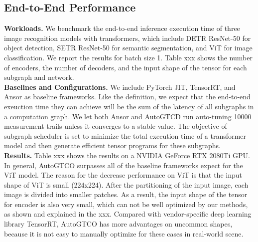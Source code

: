 \subsection{End-to-End Performance}
\textbf{Workloads.} We benchmark the end-to-end inference execution time of three image recognition models with transformers, which include DETR ResNet-50
for object detection, SETR ResNet-50 for semantic segmentation, and ViT for image classification. We report the results for batch size 1. Table xxx shows the number of encoders, the number of decoders, and the input shape of the tensor for each subgraph and network. \\
\textbf{Baselines and Configurations.} We include PyTorch JIT, TensorRT, and Ansor as baseline frameworks. Like the definition, we expect that
the end-to-end exeuction time they can achieve will be the sum of the latency of all subgraphs in a computation graph. We let both Ansor and AutoGTCD run 
auto-tuning 10000 measurement trails unless it converges to a stable value. The objective of subgraph scheduler is set to minimize the total execution time
of a transformer model and then generate efficient tensor programs for these subgraphs.\\
\textbf{Results.} Table xxx shows the results on a NVIDIA GeForce RTX 2080Ti GPU. In general, AutoGTCO surpasses all of the baseline frameworks expect for the ViT model. The reason for the decrease performance on ViT is that the input shape of ViT is small (224x224). After the partitioning of the input
image, each image is divided into smaller patches. As a result, the input shape of the tensor for encoder is also very small, which can not be well optimized by our methods, as shown and explained in the xxx. Compared with vendor-specific deep learning library TensorRT, AutoGTCO
has more advantages on uncommon shapes, because it is not easy to manually optimize for these cases in real-world scene.





